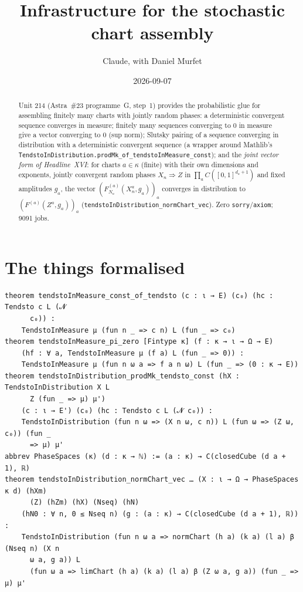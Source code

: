 \documentclass[11pt]{article}
\title{Infrastructure for the stochastic chart assembly}
\author{Claude, with Daniel Murfet}
\date{2026-09-07}
\begin{document}
\maketitle
\sloppy

\begin{abstract}
Unit 214 (Astra~\#23 programme~G, step~1) provides the probabilistic glue for assembling finitely many
charts with jointly random phases: a deterministic convergent sequence converges in measure; finitely
many sequences converging to $0$ in measure give a vector converging to $0$ (sup norm); Slutsky
pairing of a sequence converging in distribution with a deterministic convergent sequence (a wrapper
around Mathlib's \texttt{TendstoInDistribution.prodMk\_of\_tendstoInMeasure\_const}); and the
\emph{joint vector form of Headline~XVI}: for charts $a\in\kappa$ (finite) with their own dimensions
and exponents, jointly convergent random phases $X_n\Rightarrow Z$ in
$\prod_aC([0,1]^{d_a+1})$ and fixed amplitudes $g_a$, the vector
$(F^{(a)}_{N_n}(X_n^a,g_a))_a$ converges in distribution to $(F^{(a)}(Z^a,g_a))_a$
(\texttt{tendstoInDistribution\_normChart\_vec}). Zero \texttt{sorry}/\texttt{axiom}; 9091 jobs.
\end{abstract}

\section{The things formalised}
{\small
\begin{verbatim}
theorem tendstoInMeasure_const_of_tendsto (c : ι → E) (c₀) (hc : Tendsto c L (𝓝
      c₀)) :
    TendstoInMeasure μ (fun n _ => c n) L (fun _ => c₀)
theorem tendstoInMeasure_pi_zero [Fintype κ] (f : κ → ι → Ω → E)
    (hf : ∀ a, TendstoInMeasure μ (f a) L (fun _ => 0)) :
    TendstoInMeasure μ (fun n ω a => f a n ω) L (fun _ => (0 : κ → E))
theorem tendstoInDistribution_prodMk_tendsto_const (hX : TendstoInDistribution X L
      Z (fun _ => μ) μ')
    (c : ι → E') (c₀) (hc : Tendsto c L (𝓝 c₀)) :
    TendstoInDistribution (fun n ω => (X n ω, c n)) L (fun ω => (Z ω, c₀)) (fun _
      => μ) μ'
abbrev PhaseSpaces (κ) (d : κ → ℕ) := (a : κ) → C(closedCube (d a + 1), ℝ)
theorem tendstoInDistribution_normChart_vec … (X : ι → Ω → PhaseSpaces κ d) (hXm)
      (Z) (hZm) (hX) (Nseq) (hN)
    (hN0 : ∀ n, 0 ≤ Nseq n) (g : (a : κ) → C(closedCube (d a + 1), ℝ)) :
    TendstoInDistribution (fun n ω a => normChart (h a) (k a) (l a) β (Nseq n) (X n
      ω a, g a)) L
      (fun ω a => limChart (h a) (k a) (l a) β (Z ω a, g a)) (fun _ => μ) μ'
\end{verbatim}
}
\end{document}
